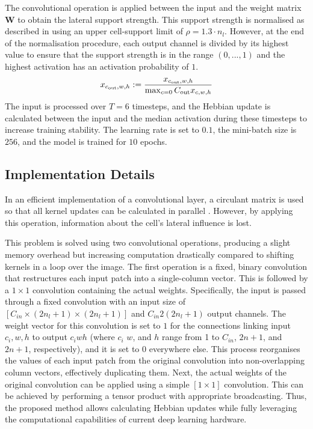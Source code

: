 The convolutional operation is applied between the input and the weight matrix $\boldsymbol{W}$ to obtain the lateral support strength.
This support strength is normalised as described in  using an upper cell-support limit of $\rho = 1.3 \cdot n_l$.
However, at the end of the normalisation procedure, each output channel is divided by its highest value to ensure that the support strength is in the range $(0, ..., 1)$ and the highest activation has an activation probability of $1$.
%
\begin{align}\eqlbl{exp_norm}
	x_{c_{\text{out}},w,h} := \frac{x_{c_{\text{out}},w,h}}{\max_{c=0} C_{\text{out}} x_{c,w,h}}
\end{align}
%
The input is processed over $T=6$ timesteps, and the Hebbian update is calculated between the input and the median activation during these timesteps to increase training stability.
The learning rate is set to $0.1$, the mini-batch size is $256$, and the model is trained for $10$ epochs.



\subsection{Implementation Details}
In an efficient implementation of a convolutional layer, a circulant matrix is used so that all kernel updates can be calculated in parallel \cite{miconi_hebbian_2021}. However, by applying this operation, information about the cell's lateral influence is lost.

This problem is solved using two convolutional operations, producing a slight memory overhead but increasing computation drastically compared to shifting kernels in a loop over the image.
The first operation is a fixed, binary convolution that restructures each input patch into a single-column vector. This is followed by a $1\times1$ convolution containing the actual weights. Specifically, the input is passed through a fixed convolution with an input size of $\left[C_{in} \times (2n_l+1) \times (2n_l+1)\right]$ and $C_{in} 2(2n_l+1)$ output channels. The weight vector for this convolution is set to $1$ for the connections linking input $c_i,w,h$ to output $c_iwh$ (where $c_i$ $w$, and $h$ range from 1 to $C_{in}$, $2n+1$, and $2n+1$, respectively), and it is set to 0 everywhere else. This process reorganises the values of each input patch from the original convolution into non-overlapping column vectors, effectively duplicating them. Next, the actual weights of the original convolution can be applied using a simple $[1\times1]$ convolution. This can be achieved by performing a tensor product with appropriate broadcasting.
Thus, the proposed method allows calculating Hebbian updates  while fully leveraging the computational capabilities of current deep learning hardware.







